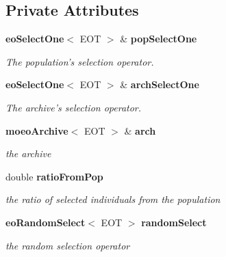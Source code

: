 \subsection*{Private Attributes}
\begin{CompactItemize}
\item 
{\bf eo\-Select\-One}$<$ EOT $>$ \& {\bf pop\-Select\-One}\label{classmoeoSelectOneFromPopAndArch_4f6d51d06d92b0a3383f9f47e3b2b682}

\begin{CompactList}\small\item\em The population's selection operator. \item\end{CompactList}\item 
{\bf eo\-Select\-One}$<$ EOT $>$ \& {\bf arch\-Select\-One}\label{classmoeoSelectOneFromPopAndArch_5e062a1deca0307a91121271d3b976ba}

\begin{CompactList}\small\item\em The archive's selection operator. \item\end{CompactList}\item 
{\bf moeo\-Archive}$<$ EOT $>$ \& {\bf arch}\label{classmoeoSelectOneFromPopAndArch_3ca71296847a931355a1e88d0cc524cb}

\begin{CompactList}\small\item\em the archive \item\end{CompactList}\item 
double {\bf ratio\-From\-Pop}\label{classmoeoSelectOneFromPopAndArch_97b57e598752bccafaaf6a8a724d9a43}

\begin{CompactList}\small\item\em the ratio of selected individuals from the population \item\end{CompactList}\item 
{\bf eo\-Random\-Select}$<$ EOT $>$ {\bf random\-Select}\label{classmoeoSelectOneFromPopAndArch_77cbe0150e70219e5a7fd48296acc4c7}

\begin{CompactList}\small\item\em the random selection operator \item\end{CompactList}\end{CompactItemize}


